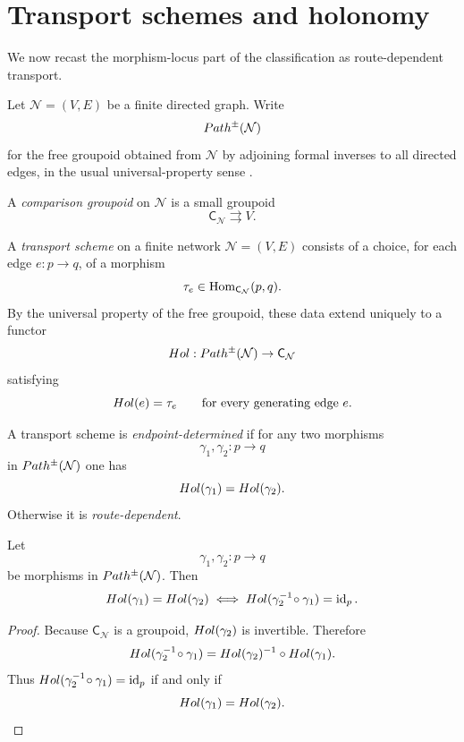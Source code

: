 \section{Transport schemes and holonomy}
\label{sec:transport}
We now recast the morphism-locus part of the classification as
route-dependent transport.
\begin{definition}
	\label{def:pathpm}
	Let \(\mathcal N=(V,E)\) be a finite directed graph. Write
	\[
		Path^\pm(\mathcal N)
	\]
	for the free groupoid obtained from \(\mathcal N\) by adjoining formal
	inverses to all directed edges, in the usual universal-property sense
	\cite{MacLane1998}.
\end{definition}
\begin{definition}
	A \emph{comparison groupoid} on \(\mathcal N\) is a small groupoid
	\[
		\mathsf C_{\mathcal N}\rightrightarrows V.
	\]
\end{definition}
\begin{definition}
	A \emph{transport scheme} on a finite network \(\mathcal N=(V,E)\)
	consists of a choice, for each edge \(e:p\to q\), of a morphism
	\[
		\tau_e\in \operatorname{Hom}_{\mathsf C_{\mathcal N}}(p,q).
	\]
	By the universal property of the free groupoid, these data extend
	uniquely to a functor
	\[
		Hol:Path^\pm(\mathcal N)\to \mathsf C_{\mathcal N}
	\]
	satisfying
	\[
		Hol(e)=\tau_e
		\qquad
		\text{for every generating edge }e.
	\]
\end{definition}
\begin{definition}
	A transport scheme is \emph{endpoint-determined} if for any two
	morphisms
	\[
		\gamma_1,\gamma_2:p\to q
	\]
	in \(Path^\pm(\mathcal N)\) one has
	\[
		Hol(\gamma_1)=Hol(\gamma_2).
	\]
	Otherwise it is \emph{route-dependent}.
\end{definition}
\begin{lemma}
	\label{lem:loop-based}
	Let
	\[
		\gamma_1,\gamma_2:p\to q
	\]
	be morphisms in \(Path^\pm(\mathcal N)\). Then
	\[
		Hol(\gamma_1)=Hol(\gamma_2)
		\iff
		Hol(\gamma_2^{-1}\!\circ\gamma_1)=\operatorname{id}_p.
	\]
\end{lemma}
\begin{proof}
	Because \(\mathsf C_{\mathcal N}\) is a groupoid, \(Hol(\gamma_2)\) is
	invertible. Therefore
	\[
		Hol(\gamma_2^{-1}\!\circ\gamma_1)
		=
		Hol(\gamma_2)^{-1}\circ Hol(\gamma_1).
	\]
	Thus \(Hol(\gamma_2^{-1}\!\circ\gamma_1)=\operatorname{id}_p\) if and only if
	\[
		Hol(\gamma_1)=Hol(\gamma_2).
	\]
\end{proof}
